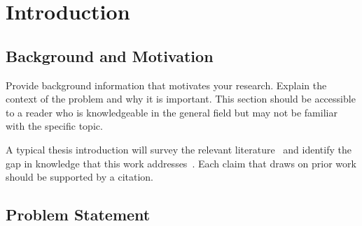 
\chapter{Introduction}
\label{ch:introduction}

\section{Background and Motivation}
\label{sec:background}

Provide background information that motivates your research.
Explain the context of the problem and why it is important.
This section should be accessible to a reader who is knowledgeable in
the general field but may not be familiar with the specific topic.

A typical thesis introduction will survey the relevant literature~\cite{lamport1994latex}
and identify the gap in knowledge that this work addresses~\cite{knuth1986texbook}.
Each claim that draws on prior work should be supported by a citation.

\section{Problem Statement}
\label{sec:problem}

